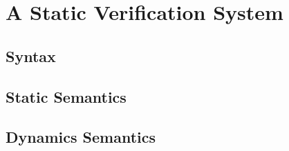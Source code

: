 \chapter{A Static Verification System}
\section{Syntax}
\section{Static Semantics}
\section{Dynamics Semantics}